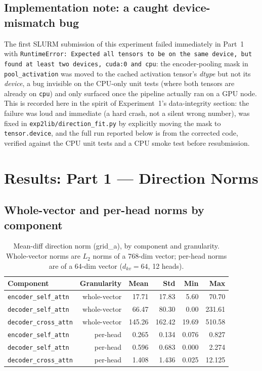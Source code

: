 \documentclass[11pt]{article}
\begin{document}
\subsection{Implementation note: a caught device-mismatch bug}

The first SLURM submission of this experiment failed immediately in Part~1
with \texttt{RuntimeError: Expected all tensors to be on the same device,
but found at least two devices, cuda:0 and cpu}: the encoder-pooling mask
in \texttt{pool\_activation} was moved to the cached activation tensor's
\emph{dtype} but not its \emph{device}, a bug invisible on the CPU-only
unit tests (where both tensors are already on \texttt{cpu}) and only
surfaced once the pipeline actually ran on a GPU node. This is recorded
here in the spirit of Experiment~1's data-integrity section: the failure
was loud and immediate (a hard crash, not a silent wrong number), was fixed
in \texttt{exp2lib/direction\_fit.py} by explicitly moving the mask to
\texttt{tensor.device}, and the full run reported below is from the
corrected code, verified against the CPU unit tests and a CPU smoke test
before resubmission.

\section{Results: Part 1 --- Direction Norms}
\label{sec:part1results}

\subsection{Whole-vector and per-head norms by component}

\begin{table}[H]
\centering
\caption{Mean-diff direction norm (grid\_a), by component and granularity.
Whole-vector norms are $L_2$ norms of a 768-dim vector; per-head norms are
of a 64-dim vector ($d_{kv}=64$, 12 heads).}
\label{tab:norms}
\begin{tabular}{lrrrrr}
\toprule
Component & Granularity & Mean & Std & Min & Max \\
\midrule
\texttt{encoder\_self\_attn} & whole-vector & 17.71 & 17.83 & 5.60 & 70.70 \\
\texttt{decoder\_self\_attn} & whole-vector & 66.47 & 80.30 & 0.00 & 231.61 \\
\texttt{decoder\_cross\_attn}& whole-vector & 145.26 & 162.42 & 19.69 & 510.58 \\
\midrule
\texttt{encoder\_self\_attn} & per-head & 0.265 & 0.134 & 0.076 & 0.827 \\
\texttt{decoder\_self\_attn} & per-head & 0.596 & 0.683 & 0.000 & 2.274 \\
\texttt{decoder\_cross\_attn}& per-head & 1.408 & 1.436 & 0.025 & 12.125 \\
\bottomrule
\end{tabular}
\end{table}
\end{document}
